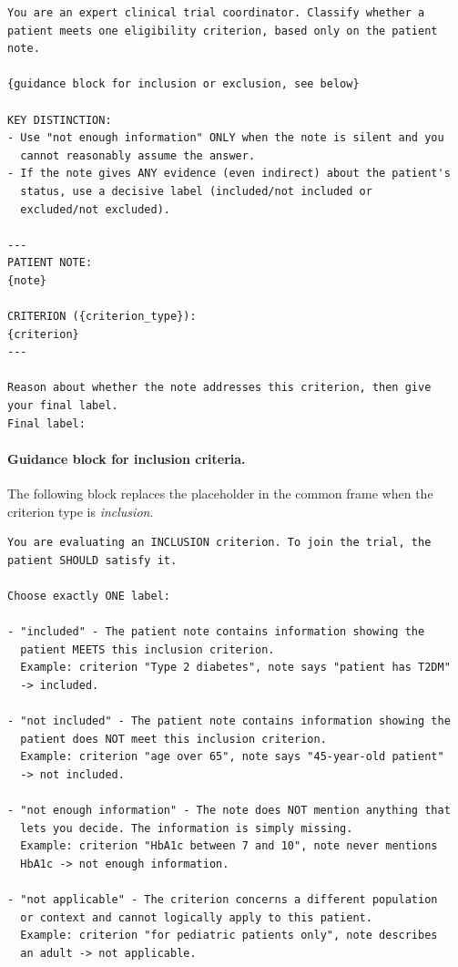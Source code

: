 \begin{lstlisting}[caption={Prompt B for Instruct models --- common 
    frame}, label={lst:prompt-b-instruct-frame}, 
    breaklines=true, basicstyle=\ttfamily\small]
You are an expert clinical trial coordinator. Classify whether a
patient meets one eligibility criterion, based only on the patient
note.

{guidance block for inclusion or exclusion, see below}

KEY DISTINCTION:
- Use "not enough information" ONLY when the note is silent and you
  cannot reasonably assume the answer.
- If the note gives ANY evidence (even indirect) about the patient's
  status, use a decisive label (included/not included or
  excluded/not excluded).

---
PATIENT NOTE:
{note}

CRITERION ({criterion_type}):
{criterion}
---

Reason about whether the note addresses this criterion, then give
your final label.
Final label:
\end{lstlisting}

\paragraph{Guidance block for inclusion criteria.}
The following block replaces the placeholder in the common frame when 
the criterion type is \emph{inclusion}.

\begin{lstlisting}[caption={Prompt B for Instruct models --- inclusion 
    guidance}, label={lst:prompt-b-instruct-incl}, 
    breaklines=true, basicstyle=\ttfamily\small]
You are evaluating an INCLUSION criterion. To join the trial, the
patient SHOULD satisfy it.

Choose exactly ONE label:

- "included" - The patient note contains information showing the
  patient MEETS this inclusion criterion.
  Example: criterion "Type 2 diabetes", note says "patient has T2DM"
  -> included.

- "not included" - The patient note contains information showing the
  patient does NOT meet this inclusion criterion.
  Example: criterion "age over 65", note says "45-year-old patient"
  -> not included.

- "not enough information" - The note does NOT mention anything that
  lets you decide. The information is simply missing.
  Example: criterion "HbA1c between 7 and 10", note never mentions
  HbA1c -> not enough information.

- "not applicable" - The criterion concerns a different population
  or context and cannot logically apply to this patient.
  Example: criterion "for pediatric patients only", note describes
  an adult -> not applicable.
\end{lstlisting}

